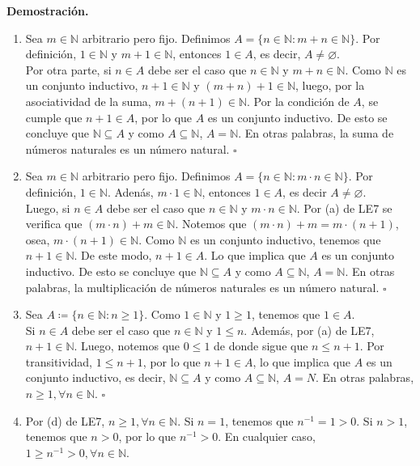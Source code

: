 \documentclass[11pt]{article}
\newcommand{\N}{\mathbb{N}}
\let\emptyset\varnothing
\begin{document}
\textbf{Demostración.}

\begin{enumerate}[label=\alph*)]
    \item Sea $m\in \N$ arbitrario pero fijo. Definimos $A=\{ n\in \N : m+n \in \N \}$. Por definición, $1\in \N$ y $m+1\in \N$, entonces $1\in A$, es decir, $A\neq \emptyset$. \\[5pt] Por otra parte, si $n\in A$ debe ser el caso que $n\in \N$ y $m+n\in \N$. Como $\N$ es un conjunto inductivo, $n+1 \in \N$ y $(m+n)+1 \in \N$, luego, por la asociatividad de la suma, $m+(n+1)\in \N$. Por la condición de $A$, se cumple que $n+1\in A$, por lo que $A$ es un conjunto inductivo. De esto se concluye que $\N\subseteq A$ y como $A\subseteq \N$, $A=\N$. En otras palabras, la suma de números naturales es un número natural. \mbox{}\hfill $\square$
    
    \item Sea $m\in \N$ arbitrario pero fijo. Definimos $A=\{n\in \N: m\cdot n \in \N\}$. Por definición, $1 \in \N$. Adenás, $m\cdot 1 \in \N$, entonces $1 \in A$, es decir $A \neq \emptyset$.\\[5pt] 
    Luego, si $n \in A$ debe ser el caso que $n\in \N$ y $m \cdot n \in \N$. Por (a) de LE7 se verifica que $(m \cdot n) + m \in \N$. Notemos que $(m \cdot n) + m=m \cdot (n+1)$, osea, $m \cdot (n+1) \in \N$. Como $\N$ es un conjunto inductivo, tenemos que $n+1\in \N$. De este modo, $n+1\in A$. Lo que implica que $A$ es un conjunto inductivo. De esto se concluye que $\N \subseteq A$ y como $A\subseteq \N$, $A=\N$. En otras palabras, la multiplicación de números naturales es un número natural. \mbox{}\hfill $\square$

    \item Sea $A\coloneqq \{n\in \N: n\geq 1\}$. Como $1\in \N$ y $1\geq 1$, tenemos que $1\in A$.\\[5pt]
    Si $n\in A$ debe ser el caso que $n\in \N$ y $1\leq n$. Además, por (a) de LE7, $n+1\in \N$. Luego, notemos que $0 \leq 1$ de donde sigue que $n \leq n+1$. Por transitividad, $1\leq n+1$, por lo que $n+1\in A$, lo que implica que $A$ es un conjunto inductivo, es decir, $\N\subseteq A$ y como $A\subseteq \N$, $A=N$. En otras palabras, $n\geq 1, \forall n\in\N$. \mbox{}\hfill $\square$

    \item Por (d) de LE7, $n\geq 1, \forall n\in \N$. Si $n=1$, tenemos que $n^{-1}=1>0$. Si $n>1$, tenemos que $n>0$, por lo que $n^{-1}>0$. En cualquier caso, $1\geq n^{-1}>0, \forall n\in \N$.


\end{enumerate}
\end{document}
